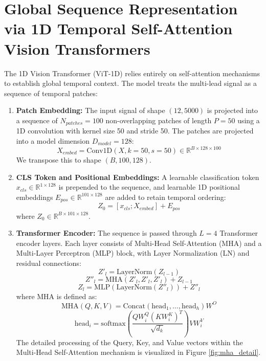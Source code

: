 \documentclass[12pt,a4paper]{report}
\begin{document}
\section{Global Sequence Representation via 1D Temporal Self-Attention Vision Transformers}
The 1D Vision Transformer (ViT-1D) relies entirely on self-attention mechanisms to establish global temporal context. The model treats the multi-lead signal as a sequence of temporal patches:
\begin{enumerate}
    \item \textbf{Patch Embedding:} The input signal of shape $(12, 5000)$ is projected into a sequence of $N_{patches} = 100$ non-overlapping patches of length $P = 50$ using a 1D convolution with kernel size 50 and stride 50. The patches are projected into a model dimension $D_{model} = 128$:
    \begin{equation}
        X_{embed} = \text{Conv1D}(X, k=50, s=50) \in \mathbb{R}^{B \times 128 \times 100}
    \end{equation}
    We transpose this to shape $(B, 100, 128)$.
    \item \textbf{CLS Token and Positional Embeddings:} A learnable classification token $x_{cls} \in \mathbb{R}^{1 \times 128}$ is prepended to the sequence, and learnable 1D positional embeddings $E_{pos} \in \mathbb{R}^{101 \times 128}$ are added to retain temporal ordering:
    \begin{equation}
        Z_{0} = [x_{cls}; X_{embed}] + E_{pos}
    \end{equation}
    where $Z_{0} \in \mathbb{R}^{B \times 101 \times 128}$.
    \item \textbf{Transformer Encoder:} The sequence is passed through $L=4$ Transformer encoder layers. Each layer consists of Multi-Head Self-Attention (MHA) and a Multi-Layer Perceptron (MLP) block, with Layer Normalization (LN) and residual connections:
    \begin{equation}
        Z'_{l} = \text{LayerNorm}(Z_{l-1})
    \end{equation}
    \begin{equation}
        Z''_{l} = \text{MHA}(Z'_{l}, Z'_{l}, Z'_{l}) + Z_{l-1}
    \end{equation}
    \begin{equation}
        Z_{l} = \text{MLP}(\text{LayerNorm}(Z''_{l})) + Z''_{l}
    \end{equation}
    where MHA is defined as:
    \begin{equation}
        \text{MHA}(Q, K, V) = \text{Concat}(\text{head}_1, \dots, \text{head}_h) W^O
    \end{equation}
    \begin{equation}
        \text{head}_i = \text{softmax}\left(\frac{Q W_i^Q (K W_i^K)^T}{\sqrt{d_k}}\right) V W_i^V
    \end{equation}
    The detailed processing of the Query, Key, and Value vectors within the Multi-Head Self-Attention mechanism is visualized in Figure \ref{fig:mha_detail}.


\end{enumerate}
\end{document}
